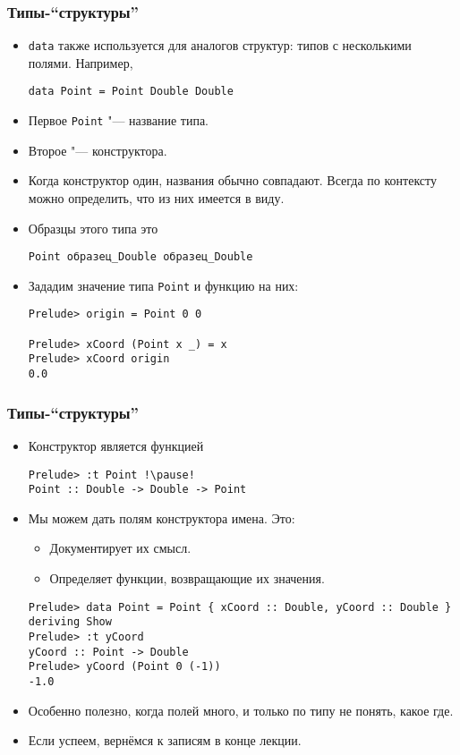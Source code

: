 \documentclass[10pt]{beamer}
\begin{document}
\begin{frame}[fragile]
\frametitle{Типы-\enquote{структуры}}
\begin{itemize}
    \item \lstinline|data| также используется для аналогов структур: типов с несколькими полями. Например,
\begin{lstlisting}[basicstyle=\ttfamily\footnotesize]
data Point = Point Double Double
\end{lstlisting}
    \item Первое \lstinline|Point| "--- название типа.
    \item Второе "--- конструктора.
    \item Когда конструктор один, названия обычно совпадают. Всегда по контексту можно определить, что из них имеется в виду.
    \item Образцы этого типа \pause это\\
\begin{lstlisting}[basicstyle=\ttfamily\footnotesize]
Point образец_Double образец_Double
\end{lstlisting}
    \item Зададим значение типа \lstinline|Point| и функцию на них:
\begin{lstlisting}[basicstyle=\ttfamily\footnotesize]
Prelude> origin = Point 0 0

Prelude> xCoord (Point x _) = x
Prelude> xCoord origin
0.0
\end{lstlisting}
\end{itemize}
\end{frame}

\begin{frame}[fragile]
\frametitle{Типы-\enquote{структуры}}
\begin{itemize}
    \item Конструктор является функцией
\begin{lstlisting}
Prelude> :t Point !\pause!
Point :: Double -> Double -> Point
\end{lstlisting}
    \item Мы можем дать полям конструктора имена. Это:\hypertarget{rec1}{}
    \begin{itemize}
        \item Документирует их смысл.
        \item Определяет функции, возвращающие их значения.
    \end{itemize}
\begin{lstlisting}
Prelude> data Point = Point { xCoord :: Double, yCoord :: Double } deriving Show
Prelude> :t yCoord
yCoord :: Point -> Double
Prelude> yCoord (Point 0 (-1))
-1.0
\end{lstlisting}
\item Особенно полезно, когда полей много, и только по типу не понять, какое где.
\item Если успеем, вернёмся к записям в конце лекции. \hyperlink{rec2}{}
\end{itemize}
\end{frame}
\end{document}
